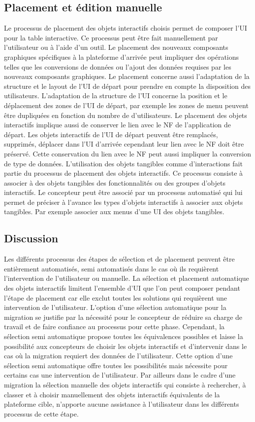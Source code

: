 {\raggedright
\subsection{Placement et édition manuelle}
}
Le processus de placement des objets interactifs choisis permet de composer l'UI pour la table interactive. Ce processus peut être fait manuellement par l'utilisateur ou à l'aide d'un outil.  Le placement des nouveaux composants graphiques spécifiques à la plateforme d'arrivée peut impliquer des opérations telles que les conversions de données ou l'ajout  des données requises par les nouveaux composants graphiques. 
Le placement concerne aussi l'adaptation de la structure et le layout de l'UI de départ pour prendre en compte la disposition des utilisateurs. L'adaptation de la structure de l'UI concerne la position et le déplacement des zones de l'UI de départ, par exemple les zones de menu peuvent être dupliquées en fonction du nombre de d'utilisateurs. 
Le placement des objets interactifs implique aussi de conserver le lien avec le NF de l'application de départ. Les objets interactifs de l'UI de départ peuvent être remplacés, supprimés, déplacer dans l'UI d'arrivée cependant leur lien avec le NF doit être préservé. Cette conservation du lien avec le NF peut aussi impliquer la conversion de type de données. 
L'utilisation des objets tangibles comme d'interactions fait partie du processus de placement des objets interactifs. Ce processus consiste à associer à des objets tangibles des fonctionnalités ou des groupes d'objets interactifs. Le concepteur peut être associé par un processus automatisé qui lui permet de préciser à l'avance les types d'objets interactifs à associer aux objets tangibles. Par exemple associer aux menus d'une UI des objets tangibles.
{\raggedright
\subsection{Discussion }
}
Les différents processus des étapes de sélection et de placement peuvent être entièrement automatisés, semi automatisés dans le cas où ils requièrent l'intervention de l'utilisateur ou manuelle. 
La sélection et placement automatique des objets interactifs limitent l'ensemble d'UI que l'on peut composer pendant l'étape de placement car elle exclut toutes les solutions qui requièrent une intervention de l'utilisateur. L'option d'une sélection automatique pour la migration se justifie par la nécessité pour le concepteur de réduire sa charge de travail et de faire confiance au processus pour cette phase. Cependant, la sélection semi automatique propose toutes les équivalences possibles  et laisse la possibilité aux concepteurs de choisir les objets interactifs et d'intervenir dans le cas où la migration requiert des données de l'utilisateur. Cette option d'une sélection semi automatique offre toutes les possibilités mais nécessite pour certains cas une intervention de l'utilisateur. Par ailleurs dans le cadre d'une migration la sélection manuelle des objets interactifs qui consiste à rechercher, à classer et à choisir manuellement des objets interactifs équivalents de la plateforme cible, n'apporte aucune assistance à l'utilisateur dans les différents processus de cette étape.

